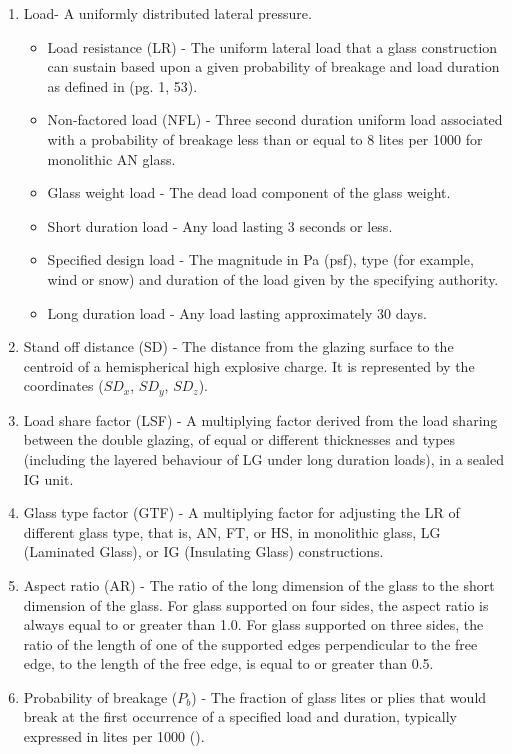 \documentclass[12pt]{article}
\begin{document}
\begin{enumerate}
\begin{itemize}
\end{itemize}
\item{Load- A uniformly distributed lateral pressure.}
\begin{itemize}
\item{Load resistance (LR) - The uniform lateral load that a glass construction can sustain based upon a given probability of breakage and load duration as defined in \cite{astm2009} (pg. 1, 53).}
\item{Non-factored load (NFL) - Three second duration uniform load associated with a probability of breakage less than or equal to 8 lites per 1000 for monolithic AN glass.}
\item{Glass weight load - The dead load component of the glass weight.}
\item{Short duration load - Any load lasting 3 seconds or less.}
\item{Specified design load - The magnitude in Pa (psf), type (for example, wind or snow) and duration of the load given by the specifying authority.}
\item{Long duration load - Any load lasting approximately 30 days.}
\end{itemize}
\item{Stand off distance (SD) - The distance from the glazing surface to the centroid of a hemispherical high explosive charge. It is represented by the coordinates (${SD_{x}}$, ${SD_{y}}$, ${SD_{z}}$).}
\item{Load share factor (LSF) - A multiplying factor derived from the load sharing between the double glazing, of equal or different thicknesses and types (including the layered behaviour of LG under long duration loads), in a sealed IG unit.}
\item{Glass type factor (GTF) - A multiplying factor for adjusting the LR of different glass type, that is, AN, FT, or HS, in monolithic glass, LG (Laminated Glass), or IG (Insulating Glass) constructions.}
\item{Aspect ratio (AR) - The ratio of the long dimension of the glass to the short dimension of the glass. For glass supported on four sides, the aspect ratio is always equal to or greater than 1.0. For glass supported on three sides, the ratio of the length of one of the supported edges perpendicular to the free edge, to the length of the free edge, is equal to or greater than 0.5.}
\item{Probability of breakage (${P_{b}}$) - The fraction of glass lites or plies that would break at the first occurrence of a specified load and duration, typically expressed in lites per 1000 (\cite{astm2016}).}
\end{enumerate}
\end{document}

